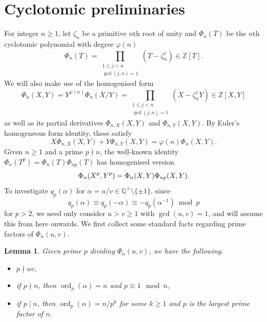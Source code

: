 \documentclass[12pt,reqno]{amsart}
\newtheorem{lemma}[theorem]{Lemma}
\theoremstyle{remark}
\DeclareMathOperator{\ord}{ord}
\begin{document}
\section{Cyclotomic preliminaries}
For integer $n\geq 1$, let $\zeta_n$ be a primitive $n$th root of unity and $\Phi_n(T)$ be the $n$th cyclotomic polynomial with degree $\varphi(n)$
\begin{equation*}
\Phi_n(T)=\prod_{\substack{1\leq j<n \\ \gcd(j,n)=1}} \left(T-\zeta_n^j\right)\in\mathbb{Z}[T].
\end{equation*}
We will also make use of the homogenised form
\begin{equation}\label{homPhi}
\Phi_{n}(X,Y)=Y^{\varphi(n)}\Phi_n(X/Y)=
\prod_{\substack{1\leq j<n \\ \gcd(j,n)=1}} \left(X-\zeta_n^jY\right)\in\mathbb{Z}[X,Y]
\end{equation}
as well as its partial derivatives $\Phi_{n,X}(X,Y)$ and $\Phi_{n,Y}(X,Y)$. By Euler's homogeneous form identity, these satisfy
\begin{equation}\label{euler}
X\Phi_{n,X}(X,Y)+Y\Phi_{n,Y}(X,Y)=\varphi(n)\Phi_n(X,Y).
\end{equation}
Given $n\geq 1$ and a prime $p\nmid n$, the well-known identity $\Phi_n(T^p)=\Phi_n(T)\Phi_{np}(T)$ has homogenised version
\begin{equation}\label{Phinp}
\Phi_n(X^p,Y^p)=\Phi_n(X,Y)\Phi_{np}(X,Y). \\[10pt]
\end{equation}
To investigate $q_p(\alpha)$ for $\alpha=u/v\in\mathbb{Q}^\times\setminus\{\pm 1\}$, since 
\[q_p(\alpha)\equiv q_p(-\alpha)\equiv -q_p(\alpha^{-1})\bmod p\]
for $p>2$, we need only consider $u>v\geq 1$ with $\gcd(u,v)=1$, and will assume this from here onwards. 
We first collect some standard facts regarding prime factors of $\Phi_n(u,v)$. 
\begin{lemma}\label{ordlem}
Given prime $p$ dividing $\Phi_n(u,v)$, we have the following.
\begin{itemize}
\item[(i)]
$p\nmid uv$,
\item[(ii)]
if $p\nmid n$, then $\ord_p(\alpha)=n$ and $p\equiv 1\mod n$,
\item[(iii)]
if $p\mid n$, then $\ord_p(\alpha)=n/p^k$ for some $k\geq 1$ and $p$ is the largest prime factor of $n$.
\end{itemize}
\end{lemma}
\end{document}
